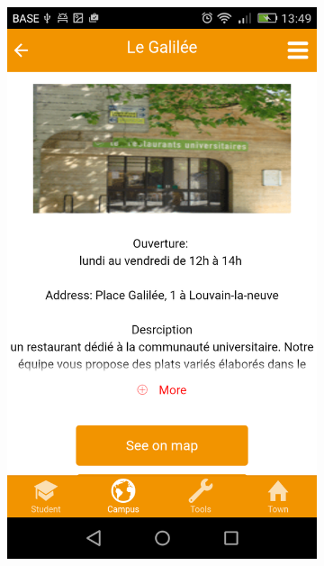 \documentclass{eplmastersthesis}
\begin{document}
\begin{figure}
\begin{subfigure}[b]{0.3\textwidth}
        \includegraphics[width=\textwidth]{Images/Application_screens/Screenshot_2016-06-06-13-49-21.png}
    \end{subfigure}
\end{figure}
\end{document}
